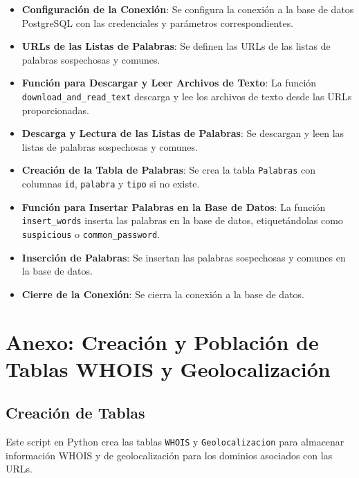 \begin{itemize}
    \item \textbf{Configuración de la Conexión}: Se configura la conexión a la base de datos PostgreSQL con las credenciales y parámetros correspondientes.
    \item \textbf{URLs de las Listas de Palabras}: Se definen las URLs de las listas de palabras sospechosas y comunes.
    \item \textbf{Función para Descargar y Leer Archivos de Texto}: La función \texttt{download\_and\_read\_text} descarga y lee los archivos de texto desde las URLs proporcionadas.
    \item \textbf{Descarga y Lectura de las Listas de Palabras}: Se descargan y leen las listas de palabras sospechosas y comunes.
    \item \textbf{Creación de la Tabla de Palabras}: Se crea la tabla \texttt{Palabras} con columnas \texttt{id}, \texttt{palabra} y \texttt{tipo} si no existe.
    \item \textbf{Función para Insertar Palabras en la Base de Datos}: La función \texttt{insert\_words} inserta las palabras en la base de datos, etiquetándolas como \texttt{suspicious} o \texttt{common\_password}.
    \item \textbf{Inserción de Palabras}: Se insertan las palabras sospechosas y comunes en la base de datos.
    \item \textbf{Cierre de la Conexión}: Se cierra la conexión a la base de datos.
\end{itemize}


\chapter*{Anexo: Creación y Población de Tablas WHOIS y Geolocalización}

\section*{Creación de Tablas}

Este script en Python crea las tablas \texttt{WHOIS} y \texttt{Geolocalizacion} para almacenar información WHOIS y de geolocalización para los dominios asociados con las URLs.

